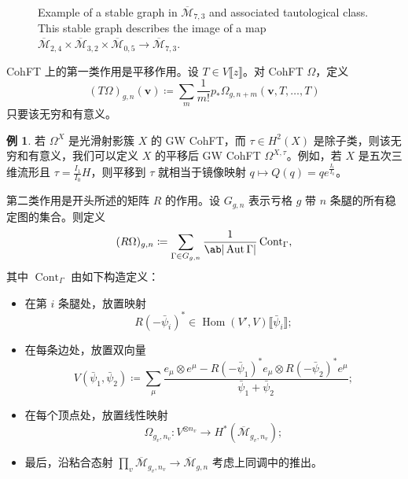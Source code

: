 \documentclass{amsart}
\theoremstyle{definition}
\newtheorem{exm}[thm]{例}
\theoremstyle{remark}
\theoremstyle{plain}
\theoremstyle{definition}
\theoremstyle{remark}
\newcommand{\Mbar}{\overline{\mathcal{M}}}
\newcommand{\mc}[1]{\mathcal{#1}}
\newcommand{\mbf}[1]{\mathbf{#1}}
\newcommand{\bv}{\mbf{v}}
\newcommand{\on}[1]{\operatorname{#1}}
\newcommand{\ol}[1]{\overline{#1}}
\newcommand{\1}{\mathbf{1}}
\newcommand{\2}{\mathbf{2}}
\newcommand{\3}{\mathbf{3}}
\newcommand{\ps}[1]{\llbracket #1 \rrbracket}
\DeclareMathOperator{\Hom}{Hom}
\DeclareMathOperator{\Aut}{Aut}
\begin{document}
\begin{figure}[htpb]
  \centering
  \caption{Example of a stable graph in $\ol{\mc{M}}_{7,3}$ and associated tautological class. This stable graph describes the image of a map
    $\ol{\mc{M}}_{2,4} \times \ol{\mc{M}}_{3,2} \times \ol{\mc{M}}_{0,5} \to \ol{\mc{M}}_{7,3}$.}
  \label{fig:stablegraph}
\end{figure}

CohFT 上的第一类作用是平移作用。设 \(T \in V\ps{z}\)。对 CohFT \(\Omega\)，定义
\[ (T\Omega)_{g,n}(\bv) \coloneqq \sum_m \frac{1}{m!} p_* \Omega_{g,n+m}(\bv, T,\ldots,T) \]
只要该无穷和有意义。

\begin{exm}
    若 \(\Omega^X\) 是光滑射影簇 \(X\) 的 GW CohFT，而 \(\tau \in H^2(X)\) 是除子类，则该无穷和有意义，我们可以定义 \(X\) 的平移后 GW CohFT \(\Omega^{X,\tau}\)。例如，若 \(X\) 是五次三维流形且 \(\tau = \frac{I_1}{I_0} H\)，则平移到 \(\tau\) 就相当于镜像映射 \(q \mapsto Q(q) = q e^{\frac{I_1}{I_0}}\)。
\end{exm}

第二类作用是开头所述的矩阵 \(R\) 的作用。设 \(G_{g,n}\) 表示亏格 \(g\) 带 \(n\) 条腿的所有稳定图的集合。则定义
\[ (R\Omega)_{g,n} \coloneqq \sum_{\Gamma \in G_{g,n}} \frac{1}{\ab|\Aut \Gamma|} \on{Cont}_{\Gamma}, \]
其中 \(\on{Cont}_{\Gamma}\) 由如下构造定义：
\begin{itemize}
    \item 在第 \(i\) 条腿处，放置映射
        \[ R(-\bar{\psi}_i)^* \in \Hom(V',V) \ps{\bar{\psi}_i}; \]
    \item 在每条边处，放置双向量
        \[ V(\bar{\psi}_1, \bar{\psi}_2) \coloneqq \sum_{\mu} \frac{e_{\mu} \otimes e^{\mu} - R(-\bar{\psi}_1)^* e_{\mu} \otimes R(-\bar{\psi}_2)^* e^{\mu}}{\bar{\psi}_1 + \bar{\psi}_2}; \]
    \item 在每个顶点处，放置线性映射
        \[ \Omega_{g_v, n_v} \colon V^{\otimes n_v} \to H^*(\Mbar_{g_v, n_v}); \]
    \item 最后，沿粘合态射 \(\prod_v \Mbar_{g_v, n_v} \to \Mbar_{g,n}\) 考虑上同调中的推出。
\end{itemize}
\end{document}
